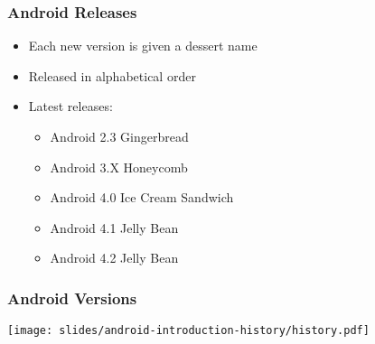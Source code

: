 \begin{frame}
  \frametitle{Android Releases}
  \begin{itemize}
  \item Each new version is given a dessert name
  \item Released in alphabetical order
  \item Latest releases:
    \begin{itemize}
    \item Android 2.3 Gingerbread
    \item Android 3.X Honeycomb
    \item Android 4.0 Ice Cream Sandwich
    \item Android 4.1 Jelly Bean 
    \item Android 4.2 Jelly Bean
    \end{itemize}
  \end{itemize}
\end{frame}

\begin{frame}
  \frametitle{Android Versions}
  \begin{center}
    \texttt{[image: slides/android-introduction-history/history.pdf]}
  \end{center}
\end{frame}
